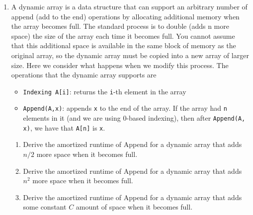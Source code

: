 \documentclass[12pt]{article}
\begin{document}
\begin{enumerate}
\item A dynamic array is a data structure that can support an arbitrary number
    of append (add to the end) operations by allocating additional memory when
    the array becomes full. The standard process is to double (adds n more
    space) the size of the array each time it becomes full. You cannot assume
    that this additional space is available in the same block of memory as the
    original array, so the dynamic array must be copied into a new array of
    larger size. Here we consider what happens when we modify this process. The
    operations that the dynamic array supports are 
\begin{itemize}
    \item {\tt Indexing A[i]}: returns the {\tt i}-th element in the array
    \item {\tt Append(A,x)}: appends {\tt x} to the end of the array.  If the
          array had {\tt n} elements in it (and we are using 0-based indexing),
          then after {\tt Append(A, x)}, we have that {\tt A[n]} is {\tt x}.
\end{itemize}

\begin{enumerate}
    \item Derive the amortized runtime of Append for a dynamic array that adds 
        $n/2$ more space when it becomes full.
    \pagebreak	
    \item Derive the amortized runtime of Append for a dynamic array that adds
        $n^2$ more space when it becomes full. 
    \pagebreak	
    \item Derive the amortized runtime of Append for a dynamic array that adds
        some constant $C$ amount of space when it becomes full.
    \pagebreak	
\end{enumerate}

\end{enumerate}
\end{document}
